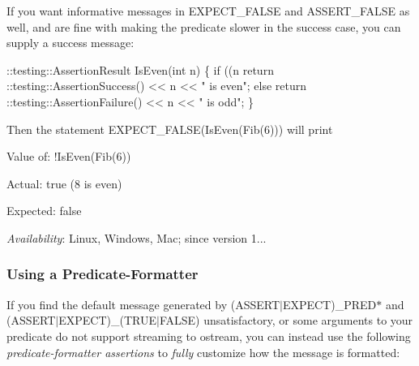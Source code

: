 If you want informative messages in {\ttfamily E\+X\+P\+E\+C\+T\+\_\+\+F\+A\+L\+SE} and {\ttfamily A\+S\+S\+E\+R\+T\+\_\+\+F\+A\+L\+SE} as well, and are fine with making the predicate slower in the success case, you can supply a success message\+:


\begin{DoxyCode}
::testing::AssertionResult IsEven(int n) \{
  if ((n %
    return ::testing::AssertionSuccess() << n << " is even";
  else
    return ::testing::AssertionFailure() << n << " is odd";
\}
\end{DoxyCode}


Then the statement {\ttfamily E\+X\+P\+E\+C\+T\+\_\+\+F\+A\+L\+SE(Is\+Even(\+Fib(6)))} will print


\begin{DoxyPre}
Value of: !IsEven(Fib(6))~\newline

Actual: true (8 is even)~\newline

Expected: false~\newline

\end{DoxyPre}


{\itshape Availability}\+: Linux, Windows, Mac; since version 1...

\subsubsection*{Using a Predicate-\/\+Formatter}

If you find the default message generated by {\ttfamily (A\+S\+S\+E\+R\+T$\vert$\+E\+X\+P\+E\+CT)\+\_\+\+P\+R\+E\+D$\ast$} and {\ttfamily (A\+S\+S\+E\+R\+T$\vert$\+E\+X\+P\+E\+CT)\+\_\+(T\+R\+U\+E$\vert$\+F\+A\+L\+SE)} unsatisfactory, or some arguments to your predicate do not support streaming to {\ttfamily ostream}, you can instead use the following {\itshape predicate-\/formatter assertions} to {\itshape fully} customize how the message is formatted\+:

